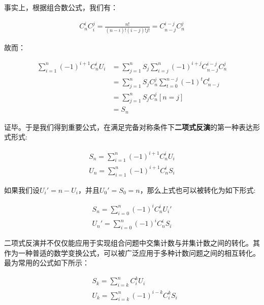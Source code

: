\documentclass[UTF8]{book}
\begin{document}
事实上，根据组合数公式，我们有：
\begin{large}
    \begin{equation}
        \begin{aligned}
            C_n^iC_i^j=\frac{n!}{(n-i)!(i-j)!j!}=C_{n-j}^{i-j}C_n^j
            \nonumber
        \end{aligned}
    \end{equation}
\end{large}
故而：
\begin{large}
    \begin{equation}
        \begin{aligned}
            \sum_{i=1}^n(-1)^{i+1}C_n^iU_i &= \sum_{j=1}^nS_j\sum_{i=j}^n(-1)^{i+j}C_{n-j}^{i-j}C_n^j \\
            &= \sum_{j=1}^nS_jC_n^j\sum_{t=0}^{n-j}(-1)^tC_{n-j}^{t} \\
            &= \sum_{j=1}^nS_jC_n^j[n=j] \\
            &= S_n
            \nonumber
        \end{aligned}
    \end{equation}
\end{large}
证毕。于是我们得到重要公式，在满足完备对称条件下\textbf{二项式反演}的第一种表达形式形式:
\begin{large}
    \begin{equation}
        \begin{aligned}
            S_n=\sum_{i=1}^n(-1)^{i+1}C_n^iU_i \\
            U_n=\sum_{i=1}^n(-1)^{i+1}C_n^iS_i
            \nonumber
        \end{aligned}
    \end{equation}
\end{large}
如果我们设$U_i'=n-U_i$，并且$U_0'=S_0=n$，那么上式也可以被转化为如下形式:
\begin{large}
    \begin{equation}
        \begin{aligned}
            S_n=\sum_{i=0}^n(-1)^{i}C_n^iU_i' \\
            U_n'=\sum_{i=0}^n(-1)^{i}C_n^iS_i
            \nonumber
        \end{aligned}
    \end{equation}
\end{large}
二项式反演并不仅仅能应用于实现组合问题中交集计数与并集计数之间的转化。其作为一种普适的数学变换公式，可以被广泛应用于多种计数问题之间的相互转化。
最为常用的公式如下所示：
\begin{large}
    \begin{equation}
        \begin{aligned}
            &S_k=\sum_{i=k}^n C_i^k U_i \\
            &U_k=\sum_{i=k}^n (-1)^{i-k} C_i^k S_i
            \nonumber
        \end{aligned}
    \end{equation}
\end{large}
\end{document}
